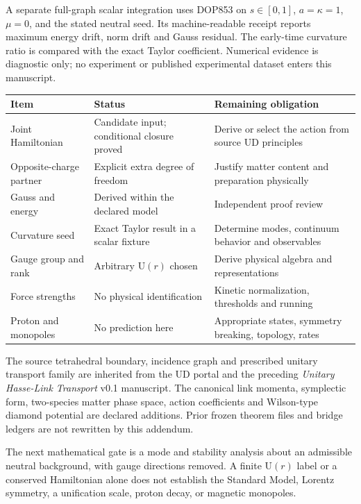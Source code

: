 \documentclass[11pt,a4paper]{article}
\newcommand{\U}{\mathrm U}\newcommand{\id}{\mathbf1}\newcommand{\dd}{\mathrm d}
\begin{document}
A separate full-graph scalar integration uses DOP853 on $s\in[0,1]$, $a=\kappa=1$, $\mu=0$, and the stated neutral seed. Its machine-readable receipt reports maximum energy drift, norm drift and Gauss residual. The early-time curvature ratio is compared with the exact Taylor coefficient. Numerical evidence is diagnostic only; no experiment or published experimental dataset enters this manuscript.

\begin{center}\small
\begin{tabular}{p{30mm}p{48mm}p{55mm}}
\toprule
Item & Status & Remaining obligation\\\midrule
Joint Hamiltonian & Candidate input; conditional closure proved & Derive or select the action from source UD principles\\
Opposite-charge partner & Explicit extra degree of freedom & Justify matter content and preparation physically\\
Gauss and energy & Derived within the declared model & Independent proof review\\
Curvature seed & Exact Taylor result in a scalar fixture & Determine modes, continuum behavior and observables\\
Gauge group and rank & Arbitrary $\U(r)$ chosen & Derive physical algebra and representations\\
Force strengths & No physical identification & Kinetic normalization, thresholds and running\\
Proton and monopoles & No prediction here & Appropriate states, symmetry breaking, topology, rates\\
\bottomrule
\end{tabular}
\end{center}

The source tetrahedral boundary, incidence graph and prescribed unitary transport family are inherited from the UD portal and the preceding \emph{Unitary Hasse-Link Transport} v0.1 manuscript. The canonical link momenta, symplectic form, two-species matter phase space, action coefficients and Wilson-type diamond potential are declared additions. Prior frozen theorem files and bridge ledgers are not rewritten by this addendum.

The next mathematical gate is a mode and stability analysis about an admissible neutral background, with gauge directions removed. A finite $\U(r)$ label or a conserved Hamiltonian alone does not establish the Standard Model, Lorentz symmetry, a unification scale, proton decay, or magnetic monopoles.
\end{document}
